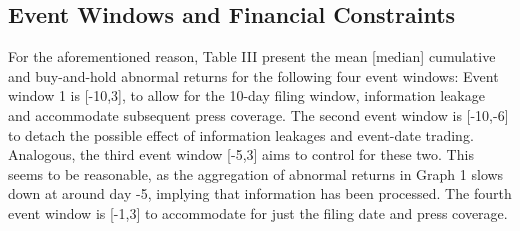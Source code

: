 \documentclass[12pt]{article}
\begin{document}
\subsection{Event Windows and Financial Constraints}

For the aforementioned reason, Table III present the mean [median] cumulative and buy-and-hold abnormal returns for the following four event windows: Event window 1 is [-10,3], to allow for the 10-day filing window, information leakage and accommodate subsequent press coverage. The second event window is [-10,-6] to detach the possible effect of information leakages and event-date trading. Analogous, the third event window [-5,3] aims to control for these two. This seems to be reasonable, as the aggregation of abnormal returns in Graph 1 slows down at around day -5, implying that information has been processed. The fourth event window is [-1,3] to accommodate for just the filing date and press coverage.
\end{document}
